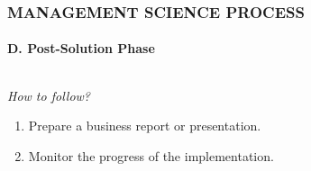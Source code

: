 \documentclass[14 pt]{beamer}
\begin{document}

\begin{frame}[t]
\frametitle{MANAGEMENT SCIENCE PROCESS}
\framesubtitle{D. Post-Solution Phase}

\begin{columns}[t]
\begin{column}{0.45\textwidth}
\emph{How to follow?}
\vskip0.5cm%
\begin{enumerate}
  \item Prepare a business report or presentation.
  \item Monitor the progress of the implementation.
\end{enumerate}
\end{column}

\begin{column}{0.45\textwidth}
\end{column}
\end{columns}
\end{frame}

\end{document}
